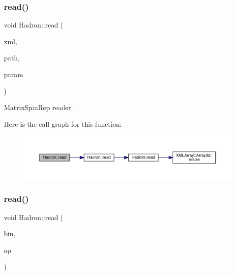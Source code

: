 \subsubsection{\texorpdfstring{read()}{read()}\hspace{0.1cm}{\footnotesize\ttfamily [18/94]}}
{\footnotesize\ttfamily void Hadron\+::read (\begin{DoxyParamCaption}\item[{\mbox{\hyperlink{classADATXML_1_1XMLReader}{X\+M\+L\+Reader}} \&}]{xml,  }\item[{const std\+::string \&}]{path,  }\item[{\mbox{\hyperlink{structHadron_1_1MatrixSpinRep__t}{Matrix\+Spin\+Rep\+\_\+t}} \&}]{param }\end{DoxyParamCaption})}



Matrix\+Spin\+Rep reader. 

Here is the call graph for this function\+:\nopagebreak
\begin{figure}[H]
\begin{center}
\leavevmode
\includegraphics[width=350pt]{d1/daf/namespaceHadron_ad46ef728c9d609cbf63217c66bdf0285_cgraph}
\end{center}
\end{figure}
\mbox{\label{namespaceHadron_a1f04a3926b07155fbf7e7887169d7f4e}} 
\subsubsection{\texorpdfstring{read()}{read()}\hspace{0.1cm}{\footnotesize\ttfamily [19/94]}}
{\footnotesize\ttfamily void Hadron\+::read (\begin{DoxyParamCaption}\item[{\mbox{\hyperlink{classADATIO_1_1BinaryReader}{Binary\+Reader}} \&}]{bin,  }\item[{\mbox{\hyperlink{structHadron_1_1QuarkNum__t}{Quark\+Num\+\_\+t}} \&}]{op }\end{DoxyParamCaption})}



